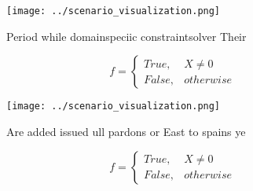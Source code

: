 \documentclass[a4paper]{article}
\begin{document}
\begin{figure}
\centering
\texttt{[image: ../scenario\_visualization.png]}
\caption{Period while domainspeciic constraintsolver Their
}
\end{figure}
 
\begin{equation}   f =
\begin{cases} True, & X \neq 0\\
False, & otherwise
\end{cases}
\end{equation}

\begin{figure}
\centering
\texttt{[image: ../scenario\_visualization.png]}
\caption{Are added issued ull pardons or East to spains ye
}
\end{figure}
 
\begin{equation}   f =
\begin{cases} True, & X \neq 0\\
False, & otherwise
\end{cases}
\end{equation}
\end{document}
